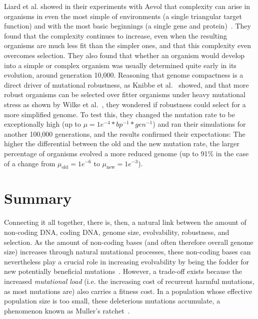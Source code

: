 Liard et al. showed in their experiments with Aevol that complexity can arise in organisms in even the most simple of environments (a single triangular target function) and with the most basic beginnings (a single gene and protein)~\cite{Liard.2018}. They found that the complexity continues to increase, even when the resulting organisms are much less fit than the simpler ones, and that this complexity even overcomes selection. They also found that whether an organism would develop into a simple or complex organism was usually determined quite early in its evolution, around generation 10,000. Reasoning that genome compactness is a direct driver of mutational robustness, as Knibbe et al.~\cite{Knibbe2007} showed, and that more robust organisms can be selected over fitter organisms under heavy mutational stress as shown by Wilke et al.~\cite{wilke2001evolution}, they wondered if robustness could select for a more simplified genome. To test this, they changed the mutation rate to be exceptionally high (up to $\mu = 1e^{-4} *bp^{-1}*gen^{-1}$) and ran their simulations for another 100,000 generations, and the results confirmed their expectations: The higher the differential between the old and the new mutation rate, the larger percentage of organisms evolved a more reduced genome (up to 91\% in the case of a change from $\mu_\text{old}=1e^{-6}$ to $\mu_\text{new}=1e^{-3}$).

\section{Summary}
Connecting it all together, there is, then, a natural link between the amount of non-coding DNA, coding DNA, genome size, evolvability, robustness, and selection. As the amount of non-coding bases (and often therefore overall genome size) increases through natural mutational processes, these non-coding bases can nevertheless play a crucial role in increasing evolvability by being the fodder for new potentially beneficial mutations~\cite{Knibbe2007}. However, a trade-off exists because the increased \textit{mutational load} (i.e. the increasing cost of recurrent harmful mutations, as most mutations are) also carries a fitness cost. In a population whose effective population size is too small, these deleterious mutations accumulate, a phenomenon known as Muller's ratchet~\cite{MullersRatchet}.